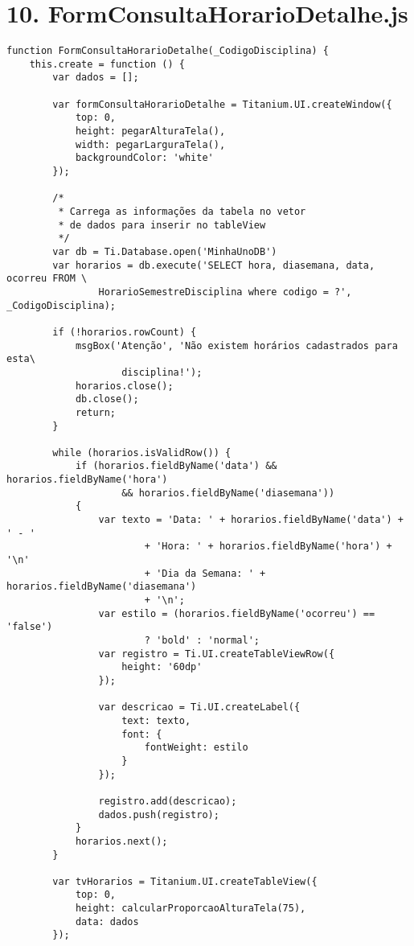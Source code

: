 \section*{10. FormConsultaHorarioDetalhe.js}
\begin{lstlisting}
function FormConsultaHorarioDetalhe(_CodigoDisciplina) {
    this.create = function () {
        var dados = [];

        var formConsultaHorarioDetalhe = Titanium.UI.createWindow({
            top: 0,
            height: pegarAlturaTela(),
            width: pegarLarguraTela(),
            backgroundColor: 'white'
        });

        /*
         * Carrega as informações da tabela no vetor
         * de dados para inserir no tableView       
         */
        var db = Ti.Database.open('MinhaUnoDB')
        var horarios = db.execute('SELECT hora, diasemana, data, ocorreu FROM \
                HorarioSemestreDisciplina where codigo = ?', _CodigoDisciplina);

        if (!horarios.rowCount) {
            msgBox('Atenção', 'Não existem horários cadastrados para esta\
                    disciplina!');
            horarios.close();
            db.close();
            return;
        }

        while (horarios.isValidRow()) {
            if (horarios.fieldByName('data') && horarios.fieldByName('hora')
                    && horarios.fieldByName('diasemana'))
            {
                var texto = 'Data: ' + horarios.fieldByName('data') + ' - ' 
                        + 'Hora: ' + horarios.fieldByName('hora') + '\n' 
                        + 'Dia da Semana: ' + horarios.fieldByName('diasemana') 
                        + '\n';
                var estilo = (horarios.fieldByName('ocorreu') == 'false')
                        ? 'bold' : 'normal';
                var registro = Ti.UI.createTableViewRow({
                    height: '60dp'
                });

                var descricao = Ti.UI.createLabel({
                    text: texto,
                    font: {
                        fontWeight: estilo
                    }
                });

                registro.add(descricao);
                dados.push(registro);
            }
            horarios.next();
        }

        var tvHorarios = Titanium.UI.createTableView({
            top: 0,
            height: calcularProporcaoAlturaTela(75),
            data: dados
        });


\end{lstlisting}
